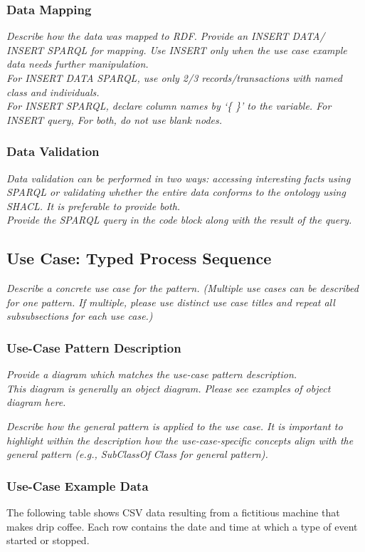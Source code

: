 \subsubsection*{Data Mapping}
 \textit{ 
Describe how the data was mapped to RDF. Provide an INSERT DATA/ INSERT SPARQL for mapping. Use INSERT only when the use case example data needs further manipulation. \\
For INSERT DATA SPARQL, use only 2/3 records/transactions with named class and individuals. \\
For INSERT SPARQL, declare column names by `\{ \}' to the variable.  
For INSERT query, 
For both, do not use blank nodes.    
  }

\subsubsection*{Data Validation}
 \textit{ 
Data validation can be performed in two ways: accessing interesting facts using SPARQL or validating whether the entire data conforms to the ontology using SHACL. It is preferable to provide both. \\
Provide the SPARQL query in the code block along with the result of the query. \\
  }

\subsection*{Use Case: Typed Process Sequence}
 \textit{ 
Describe a concrete use case for the pattern. (Multiple use cases can be described for one pattern. If multiple, please use distinct use case titles and repeat all subsubsections for each use case.)
  }

\subsubsection*{Use-Case Pattern Description}
 \textit{ 
Provide a diagram which matches the use-case pattern description. \\
\noindent \textit{This diagram is generally an object diagram. Please see examples of object diagram here.}
  }

 \textit{ 
Describe how the general pattern is applied to the use case. It is important to highlight within the description how the use-case-specific concepts align with the general pattern (e.g., SubClassOf Class for general pattern).
  }

\subsubsection*{Use-Case Example Data}
The following table shows CSV data resulting from a fictitious machine that makes drip coffee. Each row contains the date and time at which a type of event started or stopped.

